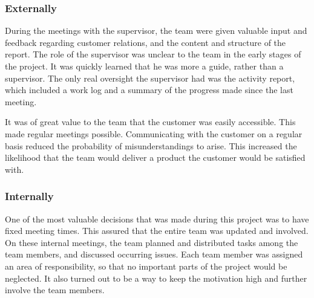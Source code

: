 \subsubsection{Externally}
During the meetings with the supervisor, the team were given valuable input and feedback regarding customer relations, and the content and structure of the report. The role of the supervisor was unclear to the team in the early stages of the project. It was quickly learned that he was more a guide, rather than a supervisor. The only real oversight the supervisor had was the activity report, which included a work log and a summary of the progress made since the last meeting.

It was of great value to the team that the customer was easily accessible. This made regular meetings possible. Communicating with the customer on a regular basis reduced the probability of misunderstandings to arise. This increased the likelihood that the team would deliver a product the customer would be satisfied with.
 
\subsubsection{Internally}
One of the most valuable decisions that was made during this project was to have fixed meeting times. This assured that the entire team was updated and involved. On these internal meetings, the team planned and distributed tasks among the team members, and discussed occurring issues. Each team member was assigned an area of responsibility, so that no important parts of the project would be neglected. It also turned out to be a way to keep the motivation high and further involve the team members.


